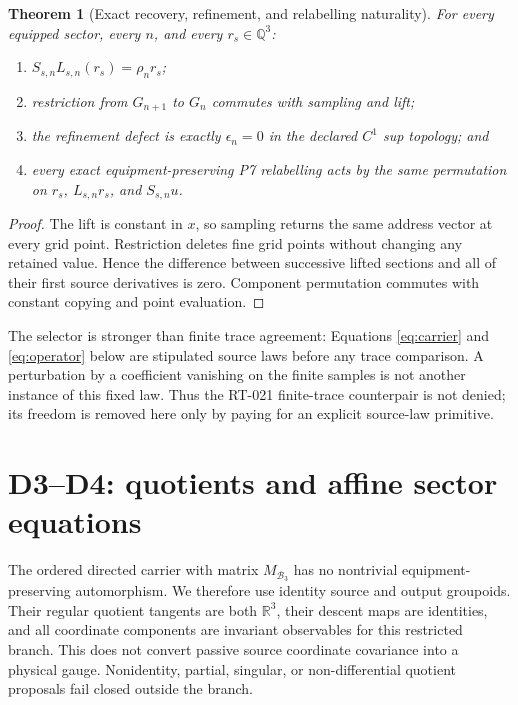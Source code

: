 \documentclass[11pt]{article}
\newtheorem{theorem}{Theorem}
\newcommand{\Bthree}{\mathcal B_3}
\newcommand{\RR}{\mathbb R}
\newcommand{\QQ}{\mathbb Q}
\begin{document}
\begin{theorem}[Exact recovery, refinement, and relabelling naturality]
\label{thm:lift}
For every equipped sector, every \(n\), and every \(r_s\in\QQ^3\):
\begin{enumerate}[leftmargin=*]
\item \(S_{s,n}L_{s,n}(r_s)=\rho_n r_s\);
\item restriction from \(G_{n+1}\) to \(G_n\) commutes with sampling and lift;
\item the refinement defect is exactly
  \(\epsilon_n=0\) in the declared \(C^1\) sup topology; and
\item every exact equipment-preserving P7 relabelling acts by the same
  permutation on \(r_s\), \(L_{s,n}r_s\), and \(S_{s,n}u\).
\end{enumerate}
\end{theorem}

\begin{proof}
The lift is constant in \(x\), so sampling returns the same address vector at
every grid point. Restriction deletes fine grid points without changing any
retained value. Hence the difference between successive lifted sections and
all of their first source derivatives is zero. Component permutation commutes
with constant copying and point evaluation.
\end{proof}

The selector is stronger than finite trace agreement: Equations
\eqref{eq:carrier} and \eqref{eq:operator} below are stipulated source laws
before any trace comparison. A perturbation by a coefficient vanishing on
the finite samples is not another instance of this fixed law. Thus the
RT-021 finite-trace counterpair is not denied; its freedom is removed here
only by paying for an explicit source-law primitive.

\section{D3--D4: quotients and affine sector equations}

The ordered directed carrier with matrix \(M_{\Bthree}\) has no nontrivial
equipment-preserving automorphism. We therefore use identity source and
output groupoids. Their regular quotient tangents are both \(\RR^3\), their
descent maps are identities, and all coordinate components are invariant
observables for this restricted branch. This does not convert passive source
coordinate covariance into a physical gauge. Nonidentity, partial, singular,
or non-differential quotient proposals fail closed outside the branch.
\end{document}
